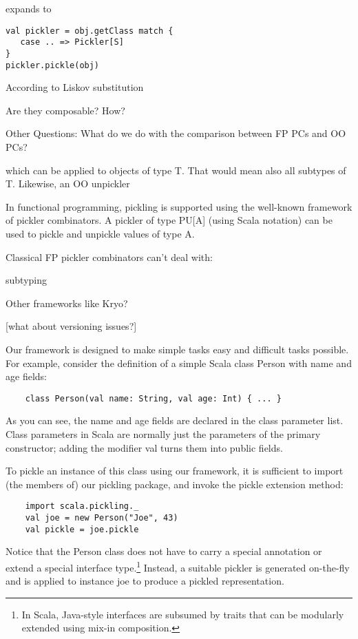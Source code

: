 \documentclass[preprint,10pt]{sigplanconf}
\theoremstyle{definition}
\begin{document}
expands to

\begin{verbatim}
val pickler = obj.getClass match {
   case .. => Pickler[S]
}
pickler.pickle(obj)
\end{verbatim}

According to Liskov substitution

Are they composable? How?

Other Questions:
What do we do with the comparison between FP PCs and OO PCs?


which can be applied to objects of type T. That would mean also all subtypes of T. Likewise, an OO unpickler


In functional programming, pickling is supported using the well-known framework of pickler combinators. A pickler of type PU[A] (using Scala notation) can be used to pickle and unpickle values of type A.

Classical FP pickler combinators can't deal with:

subtyping


Other frameworks like Kryo?

[what about versioning issues?]

Our framework is designed to make simple tasks easy and difficult tasks possible. For example, consider the definition of a simple Scala class Person with name and age fields:

\begin{verbatim}
    class Person(val name: String, val age: Int) { ... }
\end{verbatim}

As you can see, the name and age fields are declared in the class parameter list. Class parameters in Scala are normally just the parameters of the primary constructor; adding the modifier val turns them into public fields.

To pickle an instance of this class using our framework, it is sufficient to import (the members of) our pickling package, and invoke the pickle extension method:

\begin{verbatim}
    import scala.pickling._
    val joe = new Person("Joe", 43)
    val pickle = joe.pickle
\end{verbatim}

Notice that the Person class does not have to carry a special annotation or extend a special interface type.\footnote{In Scala, Java-style interfaces are subsumed by traits that can be modularly extended using mix-in composition.} Instead, a suitable pickler is generated on-the-fly and is applied to instance joe to produce a pickled representation.
\end{document}
